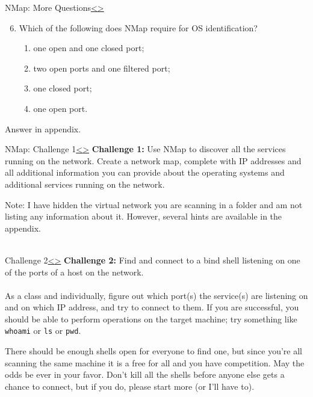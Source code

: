 \documentclass[12pt]{article}
\newenvironment{instructionblock}{\Large\bgroup}{\egroup}
\begin{document}
\pagebreak
\begin{slide}{NMap: More Questions}{\hyperref[slide 14]{\textless}\hyperref[slide 16]{\textgreater}}
\vskip 5pt
\begin{instructionblock}
\begin{enumerate}
\setcounter{enumi}{5}
\item Which of the following does  NMap require for OS identification?
   \begin{enumerate}
      \item one open and one closed port;
      \item two open ports and one filtered port;
      \item one closed port;
      \item one open port.
   \end{enumerate}
\end{enumerate}
\end{instructionblock}
\end{slide}
Answer in appendix.


\pagebreak
\begin{slide}{ NMap: Challenge 1}{\hyperref[slide 15]{\textless}\hyperref[slide 17]{\textgreater}}
   \vskip 5pt
   \begin{instructionblock}
\textbf{Challenge 1:} Use  NMap to discover all the services running on the network. Create a network map, complete with IP addresses and all additional information you can provide about the operating systems and additional services running on the network.
   \end{instructionblock}
\end{slide}
Note: I have hidden the virtual network you are scanning in a folder and am not listing any information about it. However, several hints are available in the appendix.\\\


\pagebreak
\begin{slide}{Challenge 2}{\hyperref[slide 16]{\textless}\hyperref[slide 18]{\textgreater}}
   \vskip 5pt
   \begin{instructionblock}
\textbf{Challenge 2:} Find and connect to a bind shell listening on one of the ports of a host on the network.\\\\
As a class and individually, figure out which port(s) the service(s) are listening on and on which IP address, and try to connect to them. If you are successful, you should be able to perform operations on the target machine; try something like \texttt{whoami} or \texttt{ls} or \texttt{pwd}. 
   \end{instructionblock}
\end{slide}
There should be enough shells open for everyone to find one, but since you're all scanning the same machine it is a free for all and you have competition. May the odds be ever in your favor. Don't kill all the shells before anyone else gets a chance to connect, but if you do, please start more (or I'll have to).
\end{document}
